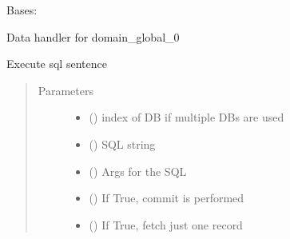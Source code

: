 \documentclass[letterpaper,10pt,english]{sphinxmanual}
\begin{document}

\begin{fulllineitems}
\label{\detokenize{bbc1.core.data_handler:bbc1.core.data_handler.DataHandlerDomain0}}
Bases: 

Data handler for domain\_global\_0

\begin{fulllineitems}
\label{\detokenize{bbc1.core.data_handler:bbc1.core.data_handler.DataHandlerDomain0.exec_sql}}
Execute sql sentence
\begin{quote}\begin{description}
\item[{Parameters}] \leavevmode\begin{itemize}
\item {} 
 () \textendash{} index of DB if multiple DBs are used

\item {} 
 () \textendash{} SQL string

\item {} 
 () \textendash{} Args for the SQL

\item {} 
 () \textendash{} If True, commit is performed

\item {} 
 () \textendash{} If True, fetch just one record

\end{itemize}


\end{description}
\end{quote}
\end{fulllineitems}
\end{fulllineitems}
\end{document}
